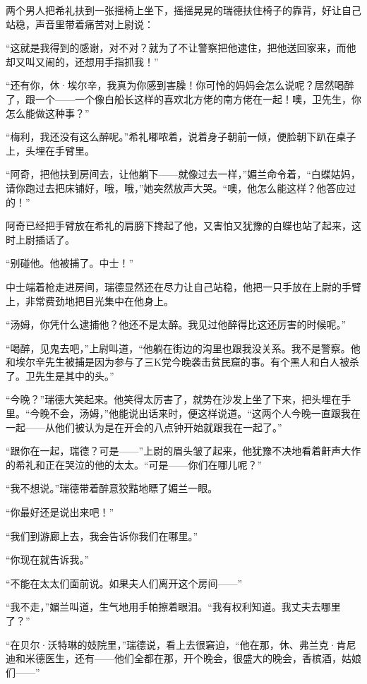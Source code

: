 \par 两个男人把希礼扶到一张摇椅上坐下，摇摇晃晃的瑞德扶住椅子的靠背，好让自己站稳，声音里带着痛苦对上尉说：
\par “这就是我得到的感谢，对不对？就为了不让警察把他逮住，把他送回家来，而他却又叫又闹的，还想用手指抓我！”
\par “还有你，休·埃尔辛，我真为你感到害臊！你可怜的妈妈会怎么说呢？居然喝醉了，跟一个——一个像白船长这样的喜欢北方佬的南方佬在一起！噢，卫先生，你怎么能做这种事？”
\par “梅利，我还没有这么醉呢。”希礼嘟哝着，说着身子朝前一倾，便脸朝下趴在桌子上，头埋在手臂里。
\par “阿奇，把他扶到房间去，让他躺下——就像过去一样，”媚兰命令着，“白蝶姑妈，请你跑过去把床铺好，哦，哦，”她突然放声大哭。“噢，他怎么能这样？他答应过的！”
\par 阿奇已经把手臂放在希礼的肩膀下搀起了他，又害怕又犹豫的白蝶也站了起来，这时上尉插话了。
\par “别碰他。他被捕了。中士！”
\par 中士端着枪走进房间，瑞德显然还在尽力让自己站稳，他把一只手放在上尉的手臂上，非常费劲地把目光集中在他身上。
\par “汤姆，你凭什么逮捕他？他还不是太醉。我见过他醉得比这还厉害的时候呢。”
\par “喝醉，见鬼去吧，”上尉叫道，“他躺在街边的沟里也跟我没关系。我不是警察。他和埃尔辛先生被捕是因为参与了三K党今晚袭击贫民窟的事。有个黑人和白人被杀了。卫先生是其中的头。”
\par “今晚？”瑞德大笑起来。他笑得太厉害了，就势在沙发上坐了下来，把头埋在手里。“今晚不会，汤姆，”他能说出话来时，便这样说道。“这两个人今晚一直跟我在一起——从他们被认为是在开会的八点钟开始就跟我在一起了。”
\par “跟你在一起，瑞德？可是——”上尉的眉头皱了起来，他犹豫不决地看着鼾声大作的希礼和正在哭泣的他的太太。“可是——你们在哪儿呢？”
\par “我不想说。”瑞德带着醉意狡黠地瞟了媚兰一眼。
\par “你最好还是说出来吧！”
\par “我们到游廊上去，我会告诉你我们在哪里。”
\par “你现在就告诉我。”
\par “不能在太太们面前说。如果夫人们离开这个房间——”
\par “我不走，”媚兰叫道，生气地用手帕擦着眼泪。“我有权利知道。我丈夫去哪里了？”
\par “在贝尔·沃特琳的妓院里，”瑞德说，看上去很窘迫，“他在那，休、弗兰克·肯尼迪和米德医生，还有——他们全都在那，开个晚会，很盛大的晚会，香槟酒，姑娘们——”
